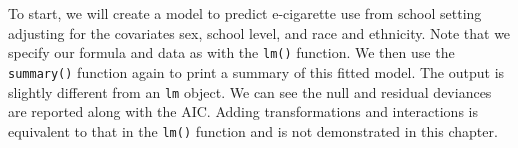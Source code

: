 \documentclass[
  letterpaper,
]{krantz}
\makeatletter
\newenvironment{Shaded}{\begin{snugshade}}{\end{snugshade}}
\newcommand{\CommentTok}[1]{\textcolor[rgb]{0.37,0.37,0.37}{#1}}
\newcommand{\FunctionTok}[1]{\textcolor[rgb]{0.28,0.35,0.67}{#1}}
\newcommand{\NormalTok}[1]{\textcolor[rgb]{0.00,0.23,0.31}{#1}}
\newcommand{\OtherTok}[1]{\textcolor[rgb]{0.00,0.23,0.31}{#1}}
\newcommand{\SpecialCharTok}[1]{\textcolor[rgb]{0.37,0.37,0.37}{#1}}
\newcommand{\StringTok}[1]{\textcolor[rgb]{0.13,0.47,0.30}{#1}}
\newenvironment{kframe}{%
\medskip{}
\setlength{\fboxsep}{.8em}
 \def\at@end@of@kframe{}%
 \ifinner\ifhmode%
  \def\at@end@of@kframe{\end{minipage}}%
  \begin{minipage}{\columnwidth}%
 \fi\fi%
 \def\FrameCommand##1{\hskip\@totalleftmargin \hskip-\fboxsep
 \colorbox{shadecolor}{##1}\hskip-\fboxsep
     \hskip-\linewidth \hskip-\@totalleftmargin \hskip\columnwidth}%
 \MakeFramed {\advance\hsize-\width
   \@totalleftmargin\z@ \linewidth\hsize
   \@setminipage}}%
 {\par\unskip\endMakeFramed%
 \at@end@of@kframe}
\renewenvironment{Shaded}{\begin{kframe}}{\end{kframe}}
\makeatother
\begin{document}
\begin{Shaded}
\end{Shaded}

To start, we will create a model to predict e-cigarette use from school
setting adjusting for the covariates sex, school level, and race and
ethnicity. Note that we specify our formula and data as with the
\texttt{lm()} function. We then use the \texttt{summary()} function
again to print a summary of this fitted model. The output is slightly
different from an \texttt{lm} object. We can see the null and residual
deviances are reported along with the AIC. Adding transformations and
interactions is equivalent to that in the \texttt{lm()} function and is
not demonstrated in this chapter.
\end{document}

